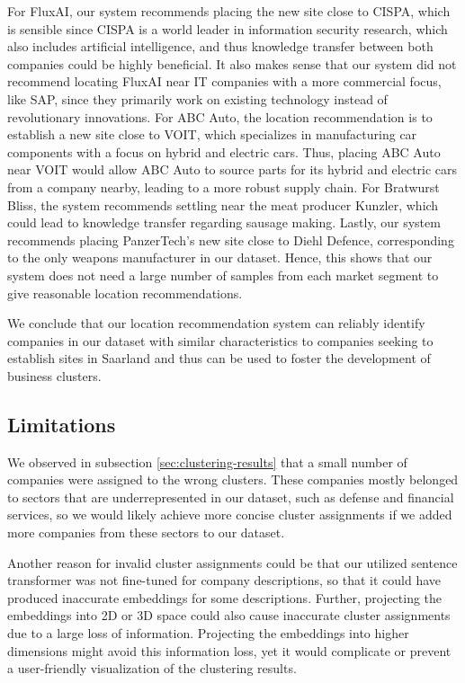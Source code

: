 \documentclass[conference]{IEEEtran}
\begin{document}
For FluxAI, our system recommends placing the new site close to CISPA, which is sensible since CISPA is a world leader in information security research, which also includes artificial intelligence, and thus knowledge transfer between both companies could be highly beneficial. It also makes sense that our system did not recommend locating FluxAI near IT companies with a more commercial focus, like SAP, since they primarily work on existing technology instead of revolutionary innovations.
For ABC Auto, the location recommendation is to establish a new site close to VOIT, which specializes in manufacturing car components with a focus on hybrid and electric cars. Thus, placing ABC Auto near VOIT would allow ABC Auto to source parts for its hybrid and electric cars from a company nearby, leading to a more robust supply chain.
For Bratwurst Bliss, the system recommends settling near the meat producer Kunzler, which could lead to knowledge transfer regarding sausage making.
Lastly, our system recommends placing PanzerTech's new site close to Diehl Defence, corresponding to the only weapons manufacturer in our dataset. Hence, this shows that our system does not need a large number of samples from each market segment to give reasonable location recommendations.

We conclude that our location recommendation system can reliably identify companies in our dataset with similar characteristics to companies seeking to establish sites in Saarland and thus can be used to foster the development of business clusters.

\subsection{Limitations}
We observed in subsection \ref{sec:clustering-results} that a small number of companies were assigned to the wrong clusters. These companies mostly belonged to sectors that are underrepresented in our dataset, such as defense and financial services, so we would likely achieve more concise cluster assignments if we added more companies from these sectors to our dataset.

Another reason for invalid cluster assignments could be that our utilized sentence transformer was not fine-tuned for company descriptions, so that it could have produced inaccurate embeddings for some descriptions. Further, projecting the embeddings into 2D or 3D space could also cause inaccurate cluster assignments due to a large loss of information. Projecting the embeddings into higher dimensions might avoid this information loss, yet it would complicate or prevent a user-friendly visualization of the clustering results.
\end{document}
